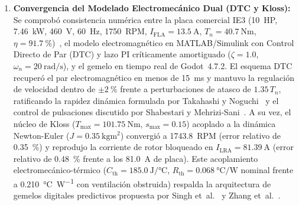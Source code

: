 \begin{enumerate}
  \item \textbf{Convergencia del Modelado Electromec\'anico Dual (DTC y
  Kloss):} Se comprob\'o consistencia num\'erica entre la placa comercial IE3
  (\qty{10}{HP}, \qty{7.46}{\kilo\watt}, \qty{460}{\volt}, \qty{60}{\hertz},
  \qty{1750}{RPM}, $I_{\mathrm{FLA}}=\qty{13.5}{\ampere}$,
  $T_n=\qty{40.7}{\newton\meter}$, $\eta=\qty{91.7}{\percent}$)~\cite{WEG2024,IEC60034},
  el modelo electromagn\'etico en MATLAB/Simulink con Control Directo de Par
  (DTC) y lazo PI cr\'iticamente amortiguado ($\zeta=1.0$,
  $\omega_n=\qty{20}{\radian\per\second}$), y el gemelo en tiempo real de
  Godot~4.7.2. El esquema DTC recuper\'o el par electromagn\'etico en menos de
  \qty{15}{\milli\second} y mantuvo la regulaci\'on de velocidad dentro de
  $\pm\qty{2}{\percent}$ frente a perturbaciones de atasco de $1.35\,T_n$,
  ratificando la rapidez din\'amica formulada por Takahashi y
  Noguchi~\cite{Takahashi1986} y el control de pulsaciones discutido por
  Shabestari y Mehrizi-Sani~\cite{Shabestari2019}. A su vez, el n\'ucleo de
  Kloss ($T_{\max}=\qty{101.75}{\newton\meter}$, $s_{\max}=0.15$) acoplado a la
  din\'amica Newton-Euler ($J=\qty{0.35}{\kilogram\meter\squared}$) convergi\'o
  a \qty{1743.8}{RPM} (error relativo de \qty{0.35}{\percent}) y reprodujo la
  corriente de rotor bloqueado en $I_{\mathrm{LRA}}=\qty{81.39}{\ampere}$
  (error relativo de \qty{0.48}{\percent} frente a los \qty{81.0}{\ampere} de
  placa). Este acoplamiento electromec\'anico-t\'ermico
  ($C_{\mathrm{th}}=\qty{185.0}{\joule\per\celsius}$,
  $R_{\mathrm{th}}=\qty{0.068}{\celsius\per\watt}$ nominal frente a
  \qty{0.210}{\celsius\per\watt} con ventilaci\'on obstruida) respalda la
  arquitectura de gemelos digitales predictivos propuesta por Singh
  et~al.~\cite{Singh2023} y Zhang et~al.~\cite{Thermal2025}.


\end{enumerate}
